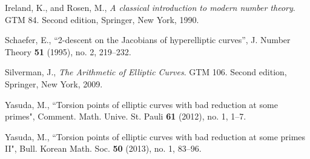 \documentclass[12pt]{amsart}
\begin{document}

\begin{thebibliography}{}
 Ireland, K., and Rosen, M., {\it A classical introduction to modern number theory}.  GTM 84.  Second edition, Springer, New York, 1990.

 Schaefer, E., ``2-descent on the Jacobians of hyperelliptic curves'',
J. Number Theory {\bf 51} (1995), no. 2, 219--232.

 Silverman, J., {\it The Arithmetic of Elliptic Curves}. GTM 106.  Second edition, Springer, New York, 2009.

 Yasuda, M., ``Torsion points of elliptic curves with bad reduction at some primes", Comment. Math. Unive. St. Pauli {\bf 61} (2012), no. 1, 1--7.

 Yasuda, M., ``Torsion points of elliptic curves with bad reduction at some primes II", Bull. Korean Math. Soc. {\bf 50} (2013), no. 1, 83--96.

\end{thebibliography}
\end{document}

